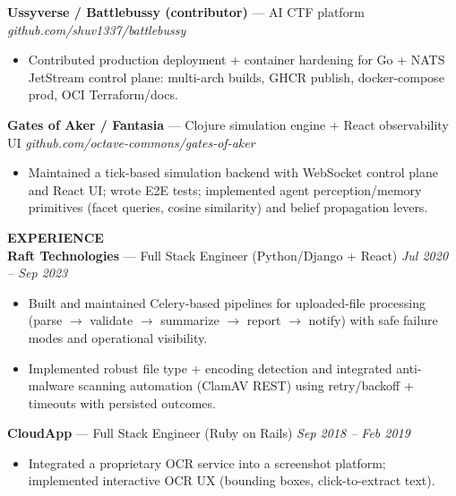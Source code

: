 \documentclass[10pt]{article}
\begin{document}
\textbf{Ussyverse / Battlebussy (contributor)} --- AI CTF platform \hfill \textit{github.com/shuv1337/battlebussy}\\
\vspace{-6pt}
\begin{itemize}
  \setlength\itemsep{-2pt}
  \setlength\parskip{0pt}
  \setlength\parsep{0pt}
  \item Contributed production deployment + container hardening for Go + NATS JetStream control plane: multi-arch builds, GHCR publish, docker-compose prod, OCI Terraform/docs.
\end{itemize}

\textbf{Gates of Aker / Fantasia} --- Clojure simulation engine + React observability UI \hfill \textit{github.com/octave-commons/gates-of-aker}\\
\vspace{-6pt}
\begin{itemize}
  \setlength\itemsep{-2pt}
  \setlength\parskip{0pt}
  \setlength\parsep{0pt}
  \item Maintained a tick-based simulation backend with WebSocket control plane and React UI; wrote E2E tests; implemented agent perception/memory primitives (facet queries, cosine similarity) and belief propagation levers.
\end{itemize}

\vspace{4pt}
\textbf{EXPERIENCE}\\

\textbf{Raft Technologies} --- Full Stack Engineer (Python/Django + React) \hfill \textit{Jul 2020 -- Sep 2023}\\
\vspace{-6pt}
\begin{itemize}
  \setlength\itemsep{-2pt}
  \setlength\parskip{0pt}
  \setlength\parsep{0pt}
  \item Built and maintained Celery-based pipelines for uploaded-file processing (parse $\rightarrow$ validate $\rightarrow$ summarize $\rightarrow$ report $\rightarrow$ notify) with safe failure modes and operational visibility.
  \item Implemented robust file type + encoding detection and integrated anti-malware scanning automation (ClamAV REST) using retry/backoff + timeouts with persisted outcomes.
\end{itemize}

\textbf{CloudApp} --- Full Stack Engineer (Ruby on Rails) \hfill \textit{Sep 2018 -- Feb 2019}\\
\vspace{-6pt}
\begin{itemize}
  \setlength\itemsep{-2pt}
  \setlength\parskip{0pt}
  \setlength\parsep{0pt}
  \item Integrated a proprietary OCR service into a screenshot platform; implemented interactive OCR UX (bounding boxes, click-to-extract text).
\end{itemize}
\end{document}

